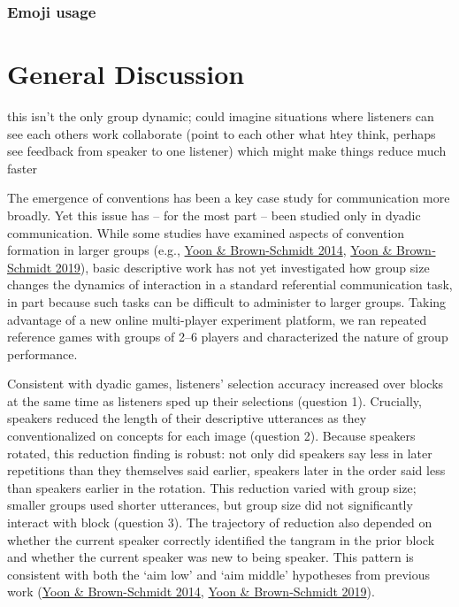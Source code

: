 \documentclass[
  english,
  a4paper,
]{article}
\begin{document}
\hypertarget{emoji-usage-1}{%
\subsubsection{Emoji usage}\label{emoji-usage-1}}

\hypertarget{general-discussion}{%
\section{General Discussion}\label{general-discussion}}

this isn't the only group dynamic; could imagine situations where listeners can see each others work collaborate (point to each other what htey think, perhaps see feedback from speaker to one listener) which might make things reduce much faster

The emergence of conventions has been a key case study for communication more broadly. Yet this issue has -- for the most part -- been studied only in dyadic communication. While some studies have examined aspects of convention formation in larger groups (e.g., \protect\hyperlink{ref-yoonAdjustingConceptualPacts2014}{Yoon \& Brown-Schmidt 2014}, \protect\hyperlink{ref-yoonAudienceDesignMultiparty2019}{Yoon \& Brown‐Schmidt 2019}), basic descriptive work has not yet investigated how group size changes the dynamics of interaction in a standard referential communication task, in part because such tasks can be difficult to administer to larger groups. Taking advantage of a new online multi-player experiment platform, we ran repeated reference games with groups of 2--6 players and characterized the nature of group performance.

Consistent with dyadic games, listeners' selection accuracy increased over blocks at the same time as listeners sped up their selections (question 1).
Crucially, speakers reduced the length of their descriptive utterances as they conventionalized on concepts for each image (question 2). Because speakers rotated, this reduction finding is robust: not only did speakers say less in later repetitions than they themselves said earlier, speakers later in the order said less than speakers earlier in the rotation. This reduction varied with group size; smaller groups used shorter utterances, but group size did not significantly interact with block (question 3). The trajectory of reduction also depended on whether the current speaker correctly identified the tangram in the prior block and whether the current speaker was new to being speaker. This pattern is consistent with both the `aim low' and `aim middle' hypotheses from previous work (\protect\hyperlink{ref-yoonAdjustingConceptualPacts2014}{Yoon \& Brown-Schmidt 2014}, \protect\hyperlink{ref-yoonAudienceDesignMultiparty2019}{Yoon \& Brown‐Schmidt 2019}).
\end{document}
